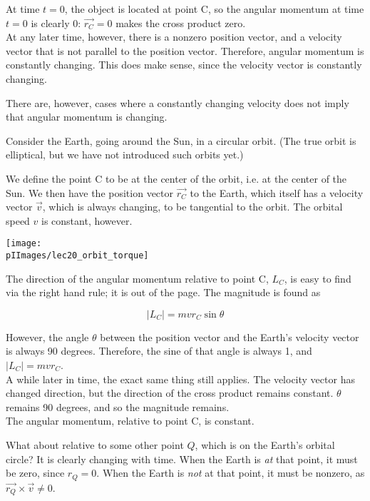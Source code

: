 At time $t = 0$, the object is located at point C, so the angular momentum at time $t = 0$ is clearly 0: $\vec{r_C} = 0$ makes the cross product zero.\\
At any later time, however, there is a nonzero position vector, and a velocity vector that is not parallel to the position vector. Therefore, angular momentum is constantly changing. This does make sense, since the velocity vector is constantly changing.

There are, however, cases where a constantly changing velocity does not imply that angular momentum is changing.

Consider the Earth, going around the Sun, in a circular orbit. (The true orbit is elliptical, but we have not introduced such orbits yet.)

We define the point C to be at the center of the orbit, i.e. at the center of the Sun. We then have the position vector $\vec{r_C}$ to the Earth, which itself has a velocity vector $\vec{v}$, which is always changing, to be tangential to the orbit. The orbital speed $v$ is constant, however.

\begin{center}
\texttt{[image: \\pIImages/lec20\_orbit\_torque]}
\end{center}

The direction of the angular momentum relative to point C, $L_C$, is easy to find via the right hand rule; it is out of the page. The magnitude is found as

\begin{equation}
|L_C| = m v r_C \sin \theta
\end{equation}

However, the angle $\theta$ between the position vector and the Earth's velocity vector is always 90 degrees. Therefore, the sine of that angle is always 1, and $|L_C| = m v r_C$.\\
A while later in time, the exact same thing still applies. The velocity vector has changed direction, but the direction of the cross product remains constant. $\theta$ remains 90 degrees, and so the magnitude remains.\\
The angular momentum, relative to point C, is constant.

What about relative to some other point $Q$, which is on the Earth's orbital circle? It is clearly changing with time. When the Earth is \emph{at} that point, it must be zero, since $r_Q = 0$. When the Earth is \emph{not} at that point, it must be nonzero, as $\vec{r_Q} \times \vec{v} \neq 0$.

